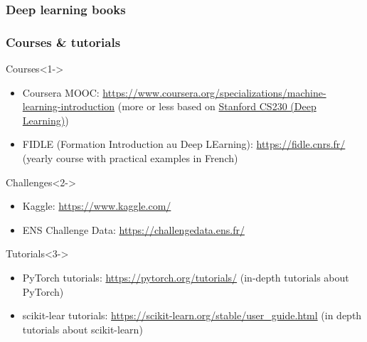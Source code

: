 \begin{frame}
  \frametitle{Deep learning books}

  \nocite{*}

  \printbibliography[heading=none,category=deep_learning]
\end{frame}

\begin{frame}
  \frametitle{Courses \& tutorials}

  \begin{block}{Courses}<1->
    \begin{itemize}
    \item Coursera MOOC:
      \url{https://www.coursera.org/specializations/machine-learning-introduction} (more or less based on \href{https://cs230.stanford.edu/}{Stanford CS230 (Deep Learning)})
    \item FIDLE (Formation Introduction au Deep LEarning): \url{https://fidle.cnrs.fr/}
      (yearly course with practical examples in French)
    \end{itemize}
  \end{block}

  \begin{block}{Challenges}<2->
    \begin{itemize}
    \item Kaggle: \url{https://www.kaggle.com/}
    \item ENS Challenge Data: \url{https://challengedata.ens.fr/}
    \end{itemize}
  \end{block}

  \begin{block}{Tutorials}<3->
    \begin{itemize}
    \item PyTorch tutorials: \url{https://pytorch.org/tutorials/} (in-depth
      tutorials about PyTorch)
    \item scikit-lear tutorials:
      \url{https://scikit-learn.org/stable/user_guide.html} (in depth tutorials
      about scikit-learn)
    \end{itemize}
  \end{block}
\end{frame}
